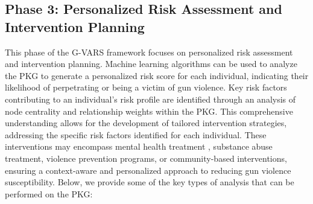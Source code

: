 \documentclass[11pt]{article}
\begin{document}
\subsection*{Phase 3: Personalized Risk Assessment and Intervention Planning}\label{phase3}
This phase of the \textsf{G-VARS} framework focuses on personalized risk assessment and intervention planning. Machine learning algorithms can be used to analyze the PKG to generate a personalized risk score for each individual, indicating their likelihood of perpetrating or being a victim of gun violence. Key risk factors contributing to an individual's risk profile are identified through an analysis of node centrality and relationship weights within the PKG. This comprehensive understanding allows for the development of tailored intervention strategies, addressing the specific risk factors identified for each individual. These interventions may encompass mental health treatment \cite{chandak2023building}, substance abuse treatment, violence prevention programs, or community-based interventions, ensuring a context-aware and personalized approach to reducing gun violence susceptibility. Below, we provide some of the key types of analysis that can be performed on the PKG:
\end{document}

